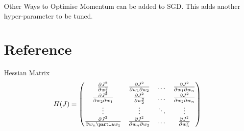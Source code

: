 \documentclass[11pt,a4paper]{article}
\begin{document}
\begin{remark}{Other Ways to Optimise}
  Momentum can be added to SGD. This adds another hyper-parameter to be tuned.
\end{remark}

\newpage
\setcounter{section}{-1}
\section{Reference}

\begin{definition}{Hessian Matrix}
  \[ H(J)=\begin{pmatrix}\frac{\partial J^2}{\partial w_1^2}&\frac{\partial J^2}{\partial w_1\partial w_2}&\dots&\frac{\partial J^2}{\partial w_1\partial w_n}\\\frac{\partial J^2}{\partial w_2\partial w_1}&\frac{\partial J^2}{\partial w_2^2}&\dots&\frac{\partial J^2}{\partial w_2\partial w_n}\\\vdots&\vdots&\ddots&\vdots\\\frac{\partial J^2}{\partial w_n\partla w_1}&\frac{\partial J^2}{\partial w_n\partial w_2}&\dots&\frac{\partial J^2}{\partial w_n^2}\end{pmatrix}\]
\end{definition}
\end{document}
